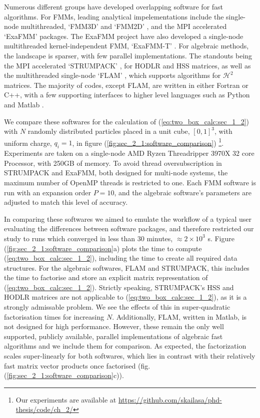 Numerous different groups have developed overlapping software for fast algorithms. For FMMs, leading analytical impelementations include the single-node multithreaded, `FMM3D' and `FMM2D' \cite{fmm3d, fmm2d}, and the MPI accelerated  `ExaFMM' \cite{exafmm} packages. The ExaFMM project have also developed a single-node multithreaded kernel-independent FMM, `ExaFMM-T' \cite{wang2021exafmm}. For algebraic methods, the landscape is sparser, with few parallel implementations. The standouts being the MPI accelerated `STRUMPACK' \cite{ghyselsstrumpack}, for HODLR and HSS matrices, as well as the multithreaded single-node `FLAM' \cite{ho2020flam}, which supports algorithms for $\mathcal{H}^2$ matrices. The majority of codes, except FLAM, are written in either Fortran or C++, with a few supporting interfaces to higher level languages such as Python and Matlab \cite{wang2021exafmm,fmm3d}.

We compare these softwares for the calculation of (\ref{eq:two_box_calc:sec_1_2}) with $N$ randomly distributed particles placed in a unit cube, $[0, 1]^3$, with uniform charge, $q_i=1$, in figure (\ref{fig:sec_2_1:software_comparison}) \footnote{Our experiments are available at \url{https://github.com/skailasa/phd-thesis/code/ch_2/}}. Experiments are taken on a single-node AMD Ryzen Threadripper 3970X 32 core Processor, with 250GB of memory. To avoid thread oversubscription in STRUMPACK and ExaFMM, both designed for multi-node systems, the maximum number of OpenMP threads is restricted to one. Each FMM software is run with an expansion order $P=10$, and the algebraic software's parameters are adjusted to match this level of accuracy.

In comparing these softwares we aimed to emulate the workflow of a typical user evaluating the differences between software packages, and therefore restricted our study to runs which converged in less than 30 minutes, $\approx 2 \times 10^3$ s. Figure (\ref{fig:sec_2_1:software_comparison}a) plots the time to compute (\ref{eq:two_box_calc:sec_1_2}), including the time to create all required data structures. For the algebraic softwares, FLAM and STRUMPACK, this includes the time to factorise and store an explicit matrix representation of (\ref{eq:two_box_calc:sec_1_2}). Strictly speaking, STRUMPACK's HSS and HODLR matrices are not applicable to (\ref{eq:two_box_calc:sec_1_2}), as it is a strongly admissable problem. We see the effects of this in super-quadratic factorisation times for increasing $N$. Additionally, FLAM, written in Matlab, is not designed for high performance. However, these remain the only well supported, publicly available, parallel implementations of algebraic fast algorithms and we include them for comparison. As expected, the factorization scales super-linearly for both softwares, which lies in contrast with their relatively fast matrix vector products once factorised (fig. (\ref{fig:sec_2_1:software_comparison}c)). 

